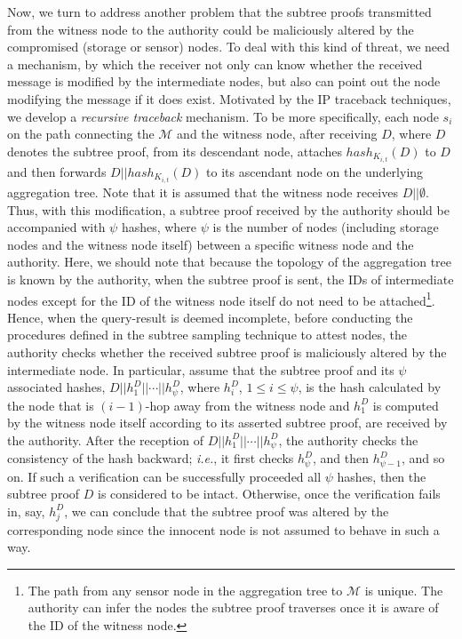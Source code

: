 \documentclass[conference]{IEEEtran}
\begin{document}
Now, we turn to address another problem that the subtree proofs transmitted from the witness node to the authority could be maliciously altered by the compromised (storage or sensor) nodes. To deal with this kind of threat, we need a mechanism, by which the receiver not only can know whether the received message is modified by the intermediate nodes, but also can point out the node modifying the message if it does exist. Motivated by the IP traceback techniques, we develop a \emph{recursive traceback} mechanism. To be more specifically, each node $s_i$ on the path connecting the $\mathcal{M}$ and the witness node, after receiving $D$, where $D$ denotes the subtree proof, from its descendant node, attaches $hash_{K_{i,t}}(D)$ to $D$ and then forwards $D||hash_{K_{i,t}}(D)$ to its ascendant node on the underlying aggregation tree. Note that it is assumed that the witness node receives $D||\emptyset$. Thus, with this modification, a subtree proof received by the authority should be accompanied with $\psi$ hashes, where $\psi$ is the number of nodes (including storage nodes and the witness node itself) between a specific witness node and the authority. Here, we should note that because the topology of the aggregation tree is known by the authority, when the subtree proof is sent, the IDs of intermediate nodes except for the ID of the witness node itself do not need to be attached\footnote{The path from any sensor node in the aggregation tree to $\mathcal{M}$ is unique. The authority can infer the nodes the subtree proof traverses once it is aware of the ID of the witness node.}. Hence, when the query-result is deemed incomplete, before conducting the procedures defined in the subtree sampling technique to attest nodes, the authority checks whether the received subtree proof is maliciously altered by the intermediate node. In particular, assume that the subtree proof and its $\psi$ associated hashes, $D||h_1^D||\cdots||h_\psi^D$, where $h_i^D$, $1\leq i\leq \psi$, is the hash calculated by the node that is $(i-1)$-hop away from the witness node and $h_1^D$ is computed by the witness node itself according to its asserted subtree proof, are received by the authority. After the reception of $D||h_1^D||\cdots||h_\psi^D$, the authority checks the consistency of the hash backward; \emph{i.e.}, it first checks $h_{\psi}^D$, and then $h_{\psi-1}^D$, and so on. If such a verification can be successfully proceeded all $\psi$ hashes, then the subtree proof $D$ is considered to be intact. Otherwise, once the verification fails in, say, $h_j^D$, we can conclude that the subtree proof was altered by the corresponding node since the innocent node is not assumed to behave in such a way.
\end{document}
